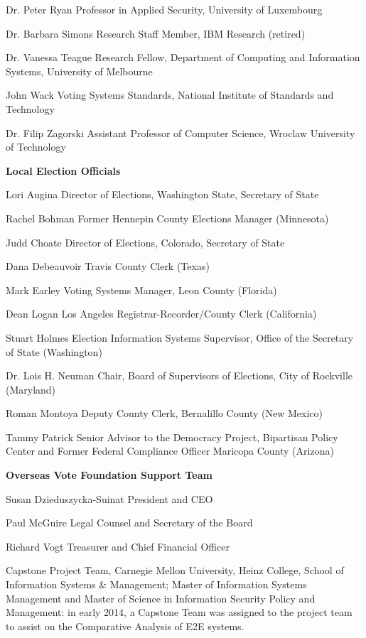 Dr. Peter Ryan
Professor in Applied Security, University of Luxembourg
 
Dr. Barbara Simons
Research Staff Member, IBM Research (retired)
 
Dr. Vanessa Teague
Research Fellow, Department of Computing and Information Systems, University of Melbourne
 
John Wack
Voting Systems Standards, National Institute of Standards and Technology
 
Dr. Filip Zagorski
Assistant Professor of Computer Science, Wroclaw University of Technology
 
\textbf{Local Election Officials}

Lori Augina
Director of Elections, Washington State, Secretary of State

Rachel Bohman
Former Hennepin County Elections Manager (Minnesota)

Judd Choate
Director of Elections, Colorado, Secretary of State

Dana Debeauvoir
Travis County Clerk (Texas)
 
Mark Earley
Voting Systems Manager, Leon County (Florida)
 
Dean Logan
Los Angeles Registrar-Recorder/County Clerk (California)

Stuart Holmes
Election Information Systems Supervisor, Office of the Secretary of State (Washington)
 
Dr. Lois H. Neuman
Chair, Board of Supervisors of Elections, City of Rockville (Maryland)
 
Roman Montoya
Deputy County Clerk, Bernalillo County (New Mexico)
 
Tammy Patrick
Senior Advisor to the Democracy Project, Bipartisan Policy Center and Former Federal Compliance Officer Maricopa County (Arizona)
 
\textbf{Overseas Vote Foundation Support Team}

Susan Dzieduszycka-Suinat
President and CEO
 
Paul McGuire
Legal Counsel and Secretary of the Board
 
Richard Vogt
Treasurer and Chief Financial Officer

Capstone Project Team, Carnegie Mellon University, Heinz College,
School of Information Systems \& Management; Master of Information
Systems Management and Master of Science in Information Security
Policy and Management: in early 2014, a Capstone Team was assigned to
the project team to assist on the Comparative Analysis of E2E systems.

